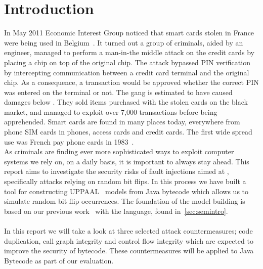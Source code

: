\chapter{Introduction}
In May 2011 Economic Interest Group noticed that smart cards stolen in France were being used in Belgium~\cite{fun}. It turned out a group of criminals, aided by an engineer, managed to perform a man-in-the middle attack on the credit cards by placing a chip on top of the original chip. The attack bypassed PIN verification by intercepting communication between a credit card terminal and the original chip. As a consequence, a transaction would be approved whether the correct PIN was entered on the terminal or not. The gang is estimated to have caused damages below . They sold items purchased with the stolen cards on the black market, and managed to exploit over 7,000 transactions before being apprehended. Smart cards are found in many places today, everywhere from phone SIM cards in phones, access cards and credit cards. The first wide spread use was French pay phone cards in 1983~\cite[p. 366]{modbank}.\\

\noindent As criminals are finding ever more sophisticated ways to exploit computer systems we rely on, on a daily basis, it is important to always stay ahead.
This report aims to investigate the security risks of fault injections aimed at \jc{}, specifically attacks relying on random bit flips. 
In this process we have built a tool for constructing UPPAAL~\cite{upptut} models from Java bytecode which allows us to simulate random bit flip occurrences. 
The foundation of the model building is based on our previous work~\cite{javasec} with the \jcl language, found in~\cref{sec:semintro}.\\\\
In this report we will take a look at three selected attack countermeasures; code duplication, call graph integrity and control flow integrity which are expected to improve the security of \jc bytecode. 
These countermeasures will be applied to Java Bytecode as part of our evaluation.
